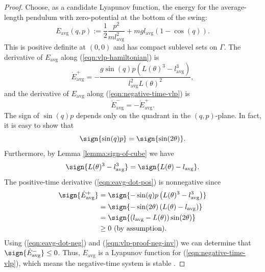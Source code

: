 \begin{proof}
   Choose, as a candidate Lyapunov function, the energy for the
   average-length pendulum with zero-potential at the bottom of the swing:
   \[
       E_\text{avg}(q,p) := \frac{1}{2}\frac{p^2}{m l_\text{avg}^2} 
           + m g l_\text{avg} (1-\cos(q))
      .
   \]
   This is positive definite at \((0,0)\) and has compact sublevel
   sets on \(\Gamma\). 
   The derivative of \(E_\text{avg}\) along (\ref{eqn:vlp-hamiltonian}) is
   \begin{equation}\label{eqn:eavg-dot-pos}
      \dot{E}_\text{avg}^+ = -\frac{g\sin(q)p \left(L(\theta)^3 - l_\text{avg}^3\right)}
              {l_\text{avg}^2L(\theta)^2}
      ,
   \end{equation}
   and the derivative of \(E_\text{avg}\) along (\ref{eqn:negative-time-vlp}) is
   \begin{equation}\label{eqn:eavg-dot-neg}
      \dot{E}_\text{avg}^- = - \dot{E}_\text{avg}^+
      .
   \end{equation}
   The sign of \(\sin(q)p\) depends only on the quadrant in the
   \((q,p)\)-plane. In fact, it is easy to show that
   \[
      \sign{\sin(q)p} = \sign{\sin(2\theta)}
      .
   \]
   Furthermore, by Lemma \ref{lemma:sign-of-cube} we have
   \[ 
       \sign{L(\theta)^3 - l_\text{avg}^3} = \sign{L(\theta) - l_\text{avg}}
       .
   \]
   The positive-time derivative (\ref{eqn:eavg-dot-pos}) is nonnegative since
   \begin{align}\label{eqn:vlp-proof-neg-inv}
    \sign{\dot{E}_\text{avg}^+} &= \sign{-\sin(q)p \left(L(\theta)^3 - l_\text{avg}^3\right)}
          \nonumber \\
          &= \sign{-\sin(2\theta) \left(L(\theta) - l_\text{avg}\right)}
          \nonumber \\
          &= \sign{(l_\text{avg} - L(\theta))\sin(2\theta)} 
          \nonumber \\
          &\geq 0 \text{ (by assumption)}
      .
   \end{align}
   Using (\ref{eqn:eavg-dot-neg}) and (\ref{eqn:vlp-proof-neg-inv}) 
   we can determine that \(\sign{\dot{E}_\text{avg}^-} \leq 0\). 
   Thus, \(E_\text{avg}\) is a Lyapunov function for
   (\ref{eqn:negative-time-vlp}), which means the negative-time system is stable
   \cite{lyapunov}. 


\end{proof}
